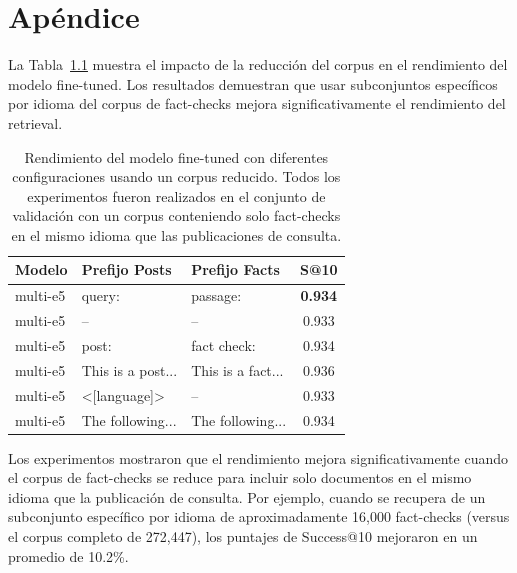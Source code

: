 \documentclass[a4paper,openany]{memoir}
\begin{document}
\backmatter

\appendix

\chapter{Apéndice}
\label{sec:appendix-results}

La Tabla~\ref{tab:prefix-experiments} muestra el impacto de la reducción del corpus en el rendimiento del modelo fine-tuned. Los resultados demuestran que usar subconjuntos específicos por idioma del corpus de fact-checks mejora significativamente el rendimiento del retrieval.

\begin{table}[htbp]
  \centering
  \caption{Rendimiento del modelo fine-tuned con diferentes configuraciones usando un corpus reducido. Todos los experimentos fueron realizados en el conjunto de validación con un corpus conteniendo solo fact-checks en el mismo idioma que las publicaciones de consulta.}
  \label{tab:prefix-experiments}
  \begin{tabular}{p{2cm}p{2.5cm}p{2.5cm}c}
    \toprule
    \textbf{Modelo} & \textbf{Prefijo Posts} & \textbf{Prefijo Facts} & \textbf{S@10} \\
    \midrule
    multi-e5 & query: & passage: & \textbf{0.934} \\
    multi-e5 & -- & -- & 0.933 \\
    multi-e5 & post: & fact check: & 0.934 \\
    multi-e5 & This is a post... & This is a fact... & 0.936 \\
    multi-e5 & <[language]> & -- & 0.933 \\
    multi-e5 & The following... & The following... & 0.934 \\
    \bottomrule
  \end{tabular}
\end{table}

Los experimentos mostraron que el rendimiento mejora significativamente cuando el corpus de fact-checks se reduce para incluir solo documentos en el mismo idioma que la publicación de consulta. Por ejemplo, cuando se recupera de un subconjunto específico por idioma de aproximadamente 16,000 fact-checks (versus el corpus completo de 272,447), los puntajes de Success@10 mejoraron en un promedio de 10.2\%.



\end{document}
